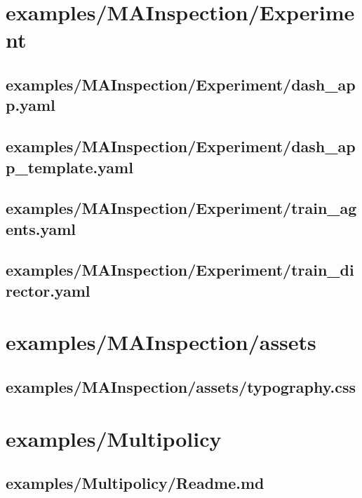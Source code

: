 \documentclass{article}
\begin{document}
\section{examples/MAInspection/Experiment}
\subsection[dash\_app.yaml]{examples/MAInspection/Experiment/dash\_app.yaml}

\newpage

\subsection[dash\_app\_template.yaml]{examples/MAInspection/Experiment/dash\_app\_template.yaml}

\newpage

\subsection[train\_agents.yaml]{examples/MAInspection/Experiment/train\_agents.yaml}

\newpage

\subsection[train\_director.yaml]{examples/MAInspection/Experiment/train\_director.yaml}

\newpage

\section{examples/MAInspection/assets}
\subsection[typography.css]{examples/MAInspection/assets/typography.css}

\newpage

\section{examples/Multipolicy}
\subsection[Readme.md]{examples/Multipolicy/Readme.md}

\newpage
\end{document}
